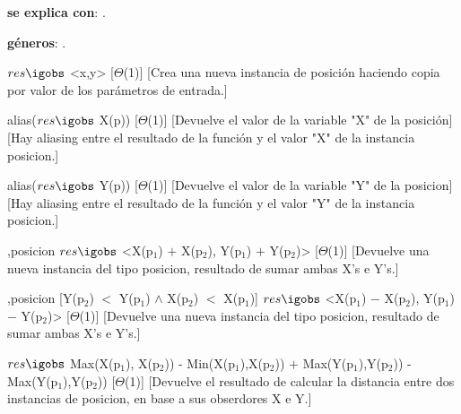 \begin{Interfaz}
	
	\textbf{se explica con}: .
	
	\textbf{géneros}: .
	
	
	{$res \igobs$ <x,y>}
	[$\Theta$(1)]
	[Crea una nueva instancia de posición haciendo copia por valor de los parámetros de entrada.]
	
	{alias($res \igobs$ X(p))}
	[$\Theta$(1)]
	[Devuelve el valor de la variable "X" de la posición]
	[Hay aliasing entre el resultado de la función y el valor "X" de la instancia posicion.]
	
	{alias($res \igobs$ Y(p))}
	[$\Theta$(1)]
	[Devuelve el valor de la variable "Y" de la posicion]
	[Hay aliasing entre el resultado de la función y el valor "Y" de la instancia posicion.]
	
	{,}{posicion}
	{$res \igobs$ <X(p$_1$) $+$ X(p$_2$), Y(p$_1$) $+$ Y(p$_2$)>}
	[$\Theta$(1)]
	[Devuelve una nueva instancia del tipo posicion, resultado de sumar ambas X's e Y's.]
	
	{,}{posicion}
	[Y(p$_2$) $<$ Y(p$_1$) $\land$ X(p$_2$) $<$ X(p$_1$)]
	{$res \igobs$ <X(p$_1$) $-$ X(p$_2$), Y(p$_1$) $-$ Y(p$_2$)>}
	[$\Theta$(1)]
	[Devuelve una nueva instancia del tipo posicion, resultado de sumar ambas X's e Y's.]
	
	{$res  \igobs$ Max(X(p$_1$), X(p$_2$)) - Min(X(p$_1$),X(p$_2$)) $+$ Max(Y(p$_1$),Y(p$_2$)) - Max(Y(p$_1$),Y(p$_2$)) }
	[$\Theta$(1)]
	[Devuelve el resultado de calcular la distancia entre dos instancias de posicion, en base a sus obserdores X e Y.]
	
\end{Interfaz}

